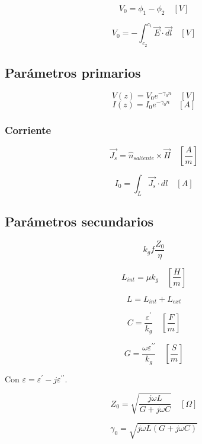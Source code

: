 \documentclass[12pt,a4paper]{article}
\begin{document}
\[ V_0 = \phi_1 - \phi_2 \quad [V] \]

\[V_0 = - \int_{c_{2}}^{c_{1}} \vec{E} \cdot \vec{dl} \quad [V] \]

\subsection{Parámetros primarios}
\label{sub:parametros_primarios}

\[ V(z) = V_0 e^{- \gamma_0 n} \quad [V] \]
\[ I(z) = I_0 e^{- \gamma_0 n} \quad [A] \]

\subsubsection{Corriente}
\label{ssub:corriente}

\[ \vec{J_s} = \hat{n}_{saliente} \times \vec{H} \quad \left[\frac{A}{m}\right] \]

\[ I_0 = \int_L \vec{J_s} \cdot dl \quad [A] \]

\subsection{Parámetros secundarios}
\label{sub:parametros_secundarios}

\[ k_g f \frac{Z_0}{\eta} \]

\[ L_{int} = \mu k_g \quad \left[ \frac{H}{m} \right] \]

\[ L = L_{int} + L_{ext} \]

\[ C = \frac{\varepsilon^{\prime}}{k_g} \quad \left[ \frac{F}{m} \right] \]

\[ G = \frac{\omega \varepsilon^{\prime\prime}}{k_g} \quad \left[ \frac{S}{m} \right] \]

Con $ \varepsilon = \varepsilon^{\prime} -j\varepsilon^{\prime\prime} $.

\[ Z_0 = \sqrt{\frac{j \omega L}{G + j \omega C}} \quad [\Omega] \]

\[ \gamma_0 =  \sqrt{j \omega L (G + j \omega C )} \]
\end{document}
